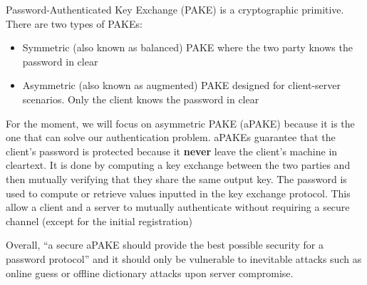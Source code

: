 \documentclass[../report.tex]{subfiles}
\begin{document}
Password-Authenticated Key Exchange (PAKE) is a cryptographic primitive. There are two types of PAKEs: 

\begin{itemize}
 \item Symmetric (also known as balanced) PAKE where the two party knows the password in clear
 \item Asymmetric (also known as augmented) PAKE designed for client-server scenarios. Only the client knows the password in clear
\end{itemize}

For the moment, we will focus on asymmetric PAKE (aPAKE) because it is the one that can solve our authentication problem.
aPAKEs guarantee that the client's password is protected because it \textbf{never} leave the client's machine in cleartext.
It is done by computing a key exchange between the two parties and then mutually verifying that they share the same output key. The password is used to compute or retrieve values inputted in the key exchange protocol.
This allow a client and a server to mutually authenticate without requiring a secure channel (except for the initial registration)



Overall, ``a secure aPAKE should provide the best possible security for a password protocol'' \cite{OPAQUE_Standard_Draft} and it should only be vulnerable to inevitable attacks such as online guess or offline dictionary attacks upon server compromise.

\paragraph{}




\end{document}
